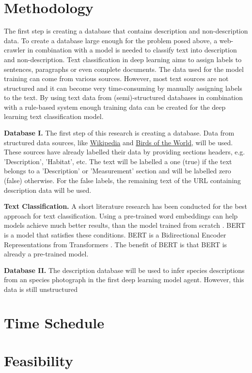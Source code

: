 \documentclass{article}
\begin{document}
\section{Methodology}


The first step is creating a database that contains description and non-description data.
To create a database large enough for the problem posed above, a web-crawler in combination with a model is needed to classify text into description and non-description.
Text classification in deep learning aims to assign labels to sentences, paragraphs or even complete documents. 
The data used for the model training can come from various sources. 
However, most text sources are not structured and it can become very time-consuming by manually assigning labels to the text.
By using text data from (semi)-structured databases in combination with a rule-based system enough training data can be created for the deep learning text classification model.
\newline

\noindent
\textbf{Database I.}
The first step of this research is creating a database.
Data from structured data sources, like \href{http://www.Wikipedia.com}{Wikipedia} and \href{https://birdsoftheworld.org}{Birds of the World}, will be used.
These sources have already labelled their data by providing sections headers, e.g. 'Description', 'Habitat', etc.
The text will be labelled a one (true) if the text belongs to a 'Description' or 'Measurement' section and will be labelled zero (false) otherwise.
For the false labels, the remaining text of the URL containing description data will be used.
\newline

\noindent
\textbf{Text Classification.}
A short literature research has been conducted for the best approach for text classification.
Using a pre-trained word embeddings can help models achieve much better results, than the model trained from scratch \cite{mikolov_distributed_2013}.   
BERT is a model that satisfies these conditions.
BERT is a Bidirectional Encoder Representations from Transformers \cite{devlin_bert_2019}.
The benefit of BERT is that BERT is already a pre-trained model.
\newline

\noindent
\textbf{Database II.}
The description database will be used to infer species descriptions from an species photograph in the first deep learning model agent.
However, this data is still unstructured


\section{Time Schedule}
\section{Feasibility}

\printbibliography
\end{document}
